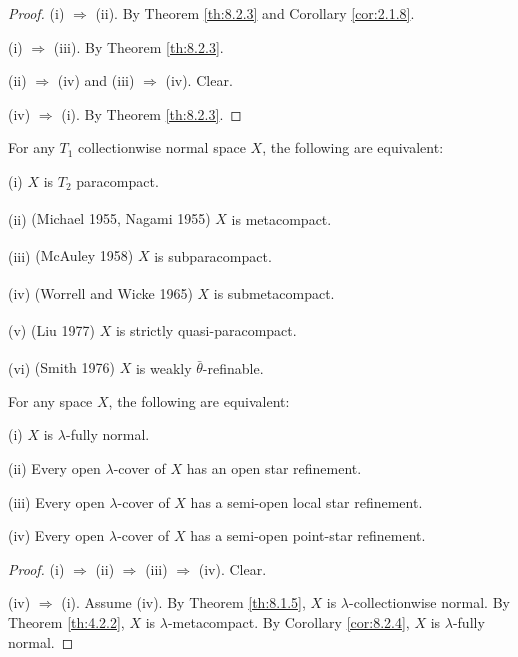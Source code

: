 \documentclass[jiang8iv.tex]{subfiles}
\begin{document}
\begin{proof}
 (i) \(\Rightarrow\) (ii). By Theorem \ref{th:8.2.3} and Corollary \ref{cor:2.1.8}.
 
(i) \(\Rightarrow\) (iii). By Theorem \ref{th:8.2.3}.

(ii) \(\Rightarrow\) (iv) and (iii) \(\Rightarrow\) (iv). Clear.

(iv) \(\Rightarrow\) (i). By Theorem \ref{th:8.2.3}.
\end{proof}

{\corollary{} \label{cor:8.2.5}  For any \(T_1\) collectionwise normal space \(X\),
the following are equivalent:

\textup{(i)} \(X\) is \(T_2\) paracompact.

\textup{(ii)}  \textup{(\hstretch{1.8}{[}Michael 1955\hstretch{1.8}{]}\textsuperscript{\cite{Michael1955}}, 
	\hstretch{1.8}{[}Nagami 1955\hstretch{1.8}{]}\textsuperscript{\cite{Nagami}})}
\(X\) is metacompact.

\textup{(iii)}  \textup{(\hstretch{1.8}{[}McAuley 1958\hstretch{1.8}{]}\textsuperscript{\cite{McAuley}})}
\(X\) is subparacompact.

\textup{(iv)}   \textup{(\hstretch{1.8}{[}Worrell and Wicke 1965\hstretch{1.8}{]}\textsuperscript{\cite{WorrellWicke}})}
\(X\) is submetacompact.

\textup{(v)} \textup{(\hstretch{1.8}{[}Liu 1977\hstretch{1.8}{]}\textsuperscript{\cite{Liu}})}
\(X\) is strictly quasi-paracompact.

\textup{(vi)} \textup{(\hstretch{1.8}{[}Smith 1976\hstretch{1.8}{]}\textsuperscript{\cite{Smith1976}})}
\(X\) is weakly \(\bar{\theta}\)-refinable.\hfill\qedsymbol
}

{\theorem{\label{th:8.2.6}}
For any space $X$, the following are equivalent:

\textup{(i)} \(X\) is \(\lambda\)-fully normal.

\textup{(ii)}  Every open \(\lambda\)-cover of \(X\) has an open star refinement.

\textup{(iii)}  Every open \(\lambda\)-cover of \(X\) has a semi-open local star refinement.

\textup{(iv)}  Every open \(\lambda\)-cover of \(X\) has a semi-open point-star refinement.
}

\begin{proof}
(i) \(\Rightarrow\) (ii) \(\Rightarrow\) (iii) \(\Rightarrow\) (iv). Clear.

(iv) \(\Rightarrow\) (i). Assume (iv). By Theorem \ref{th:8.1.5}, \(X\) is \(\lambda\)-collectionwise normal. By Theorem \ref{th:4.2.2}, \(X\) is 
$\lambda$-metacompact. By Corollary \ref{cor:8.2.4}, \(X\) is \(\lambda\)-fully normal. 
\end{proof}
\end{document}
